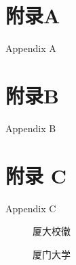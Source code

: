 \documentclass[bibstyle=numerical,font=empty]{Settings/XMUthesis}%
\begin{document}
\maketitle



\xmutableofcontents
\pagestyle{fancy}



\backmatter


\chapter{附录A}{Appendix A}

\chapter{附录B}{Appendix B}

\showfont

\chapter{附录 C}{Appendix C}
\begin{figure}[htbp!]
\centering
\caption{厦大校徽}
\xmulogo[0.75]
\end{figure}
\begin{figure}[htbp!]
\centering
\caption{厦门大学}
\xmulogon[0.75]
\end{figure}
\end{document}
